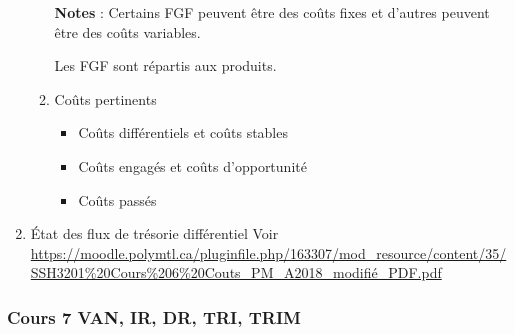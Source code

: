 \documentclass[11pt]{article}
\begin{document}
\begin{enumerate}
\begin{enumerate}
\textbf{Notes} : Certains FGF peuvent être des coûts fixes et d'autres peuvent être des
coûts variables.

Les FGF sont répartis aux produits.

\item Coûts pertinents
\label{sec:orgf5db055}

\begin{itemize}
\item Coûts différentiels et coûts stables
\item Coûts engagés et coûts d'opportunité
\item Coûts passés
\end{itemize}
\end{enumerate}

\item État des flux de trésorie différentiel
\label{sec:org3772cd0}
Voir \url{https://moodle.polymtl.ca/pluginfile.php/163307/mod\_resource/content/35/SSH3201\%20Cours\%206\%20Couts\_PM\_A2018\_modifié\_PDF.pdf}
\end{enumerate}
\subsubsection{Cours 7 VAN, IR, DR, TRI, TRIM}
\label{sec:orged21d40}
\end{document}
